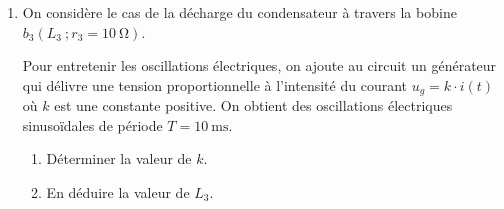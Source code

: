 \begin{enumerate}
          Dans ce cas le circuit LC est idéal.
          \begin{enumerate}
              \item Établir l'équation différentielle vérifiée par la tension
                    $u_C(t)$.
              \item La solution de l'équation différentielle s'écrit~:
                    $u_c(t)=U_{\mathrm{C,\max}} \cdot
                    \cos\left(\frac{2 \pi}{T_0}\cdot t+\varphi\right)$.
                    \begin{enumerate}
                        \item Écrire l'expression numérique de la tension
                              $u_c(t)$.
                        \item Calculer l'énergie totale du circuit LC sachant
                              qu'elle se conserve.
                    \end{enumerate}
          \end{enumerate}
    \item On considère le cas de la décharge du condensateur à travers la bobine
          $b_3\left(L_3~; r_3=\qty{10}{\ohm}\right)$.

          Pour entretenir les oscillations électriques, on ajoute au circuit un
          générateur qui délivre une tension proportionnelle à l'intensité du
          courant $u_g=k\cdot i(t)$ où $k$ est une constante positive. On obtient
          des oscillations électriques sinusoïdales de période
          $T=\qty{10}{\ms}$.
          \begin{enumerate}
              \item Déterminer la valeur de $k$.
			  \item En déduire la valeur de $L_3$.
          \end{enumerate}
\end{enumerate}

